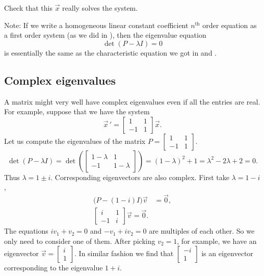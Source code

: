 \documentclass[12pt]{book}
\begin{document}
\begin{exercise}
Check that this $\vec{x}$ really solves the system.
\end{exercise}

Note: If we write a homogeneous linear constant coefficient $n^{\text{th}}$
order equation as a first order system (as we did in ),
then the eigenvalue equation
\begin{equation*}
\det(P - \lambda I) = 0
\end{equation*}
is essentially the same as the characteristic equation we got in
 and .

\subsection{Complex eigenvalues}

A matrix might very well have complex eigenvalues even if all the entries are
real.  For example, suppose that we have the system
\begin{equation*}
{\vec{x}\,}' = 
\begin{bmatrix}
1 & 1 \\
-1 & 1
\end{bmatrix}
\vec{x} .
\end{equation*}
Let us compute the eigenvalues of
the matrix $P = \left[ \begin{smallmatrix} 1 & 1 \\ -1 & 1 \end{smallmatrix}
\right]$.
\begin{equation*}
\det(P - \lambda I) =
\det\left(
\begin{bmatrix}
1-\lambda & 1 \\
-1 & 1-\lambda
\end{bmatrix}
\right)
= {(1-\lambda)}^2 + 1
= \lambda^2 - 2 \lambda + 2 = 0 .
\end{equation*}
Thus $\lambda = 1 \pm i$.
Corresponding eigenvectors are also complex.
First take $\lambda = 1-i$,
\begin{align*}
\bigl(P-(1-i) I\bigr) \vec{v} & = \vec{0} , \\
\begin{bmatrix}
i & 1 \\
-1 & i
\end{bmatrix}
\vec{v} = \vec{0}.
\end{align*}
The equations $i v_1 + v_2 = 0$ and $-v_1 + iv_2 = 0$
are multiples of each other.  So we only need to consider one of them.
After picking $v_2 = 1$, for example, we have an
eigenvector
$\vec{v} = \left[ \begin{smallmatrix} i \\ 1 \end{smallmatrix} \right]$.
In similar fashion we find that
$\left[ \begin{smallmatrix} -i \\ 1 \end{smallmatrix} \right]$
is an eigenvector corresponding to the eigenvalue $1+i$.
\end{document}
